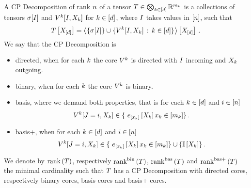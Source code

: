 \begin{definition}\label{def:cpFormats}
	A CP Decomposition of rank $n$ of a tensor $T\in\bigotimes_{k\in[d]} \mathbb{R}^{m_{k}}$ is a collections of tensors $\sigma[I]$ and $V^{k}[I,X_{k}]$ for $k\in[d]$, where $I$ takes values in $[n]$, such that
		\[  T\left[X_{[d]}\right]
		= \left\langle 
		\{\sigma[I]\} \cup \{ V^{k}[I,X_{k}] \, : \, k\in[d] \}
		\right\rangle \left[ X_{[d]} \right] \, . 
		\]
	We say that the CP Decomposition is
	\begin{itemize}
		\item directed, when for each $k$ the core $V^{k}$ is directed with $I$ incoming and $X_{k}$ outgoing.
		\item binary, when for each $k$ the core $V^{k}$ is binary.
		\item basis, where we demand both properties, that is for each $k\in[d]$ and $i\in[n]$ 
			\[ \legcoreofat{\atomenumerator}{\inddecvar,\catvariableof{\atomenumerator}}\in \{ \onehotmapofat{[\catindexof{\atomenumerator}]}{\catvariableof{\atomenumerator}} \catindexof{\atomenumerator}\in[\catdimof{\atomenumerator}] \}\, . \]
		\item basis+, when for each $k\in[d]$ and $i\in[n]$  %
			\[ \legcoreofat{\atomenumerator}{\inddecvar,\catvariableof{\atomenumerator}}\in \{ \onehotmapofat{[\catindexof{\atomenumerator}]}{\catvariableof{\atomenumerator}} \catindexof{\atomenumerator}\in[\catdimof{\atomenumerator}] \} \cup \{\onesat{\catvariableof{\atomenumerator}}\}\, . \]
	\end{itemize}
	We denote by $\mathrm{rank}\left(T\right)$, respectively $\mathrm{rank}^{\mathrm{bin}}\left(T\right)$, $\mathrm{rank}^{\mathrm{bas}}\left(T\right)$ and $\mathrm{rank}^{\mathrm{bas+}}\left(T\right)$ the minimal cardinality such that $T$ has a CP Decomposition with directed cores, respectively binary cores, basis cores and basis+ cores.
\end{definition}

